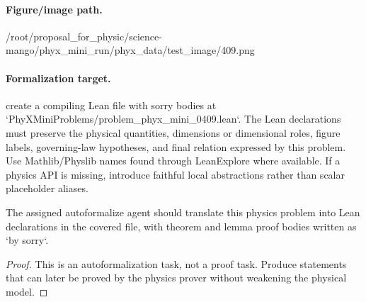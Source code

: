 \paragraph{Figure/image path.}
/root/proposal\_for\_physic/science-mango/phyx\_mini\_run/phyx\_data/test\_image/409.png

\paragraph{Formalization target.}
create a compiling Lean file with sorry bodies at `PhyXMiniProblems/problem\_phyx\_mini\_0409.lean`. The Lean declarations must preserve the physical quantities, dimensions or dimensional roles, figure labels, governing-law hypotheses, and final relation expressed by this problem.
Use Mathlib/Physlib names found through LeanExplore where available. If a physics API is missing, introduce faithful local abstractions rather than scalar placeholder aliases.

\begin{theorem}
\label{thm:physics:phyx_mini_0409:target}
The assigned autoformalize agent should translate this physics problem into Lean declarations in the covered file, with theorem and lemma proof bodies written as `by sorry`.
\end{theorem}
\begin{proof}
This is an autoformalization task, not a proof task. Produce statements that can later be proved by the physics prover without weakening the physical model.
\end{proof}

